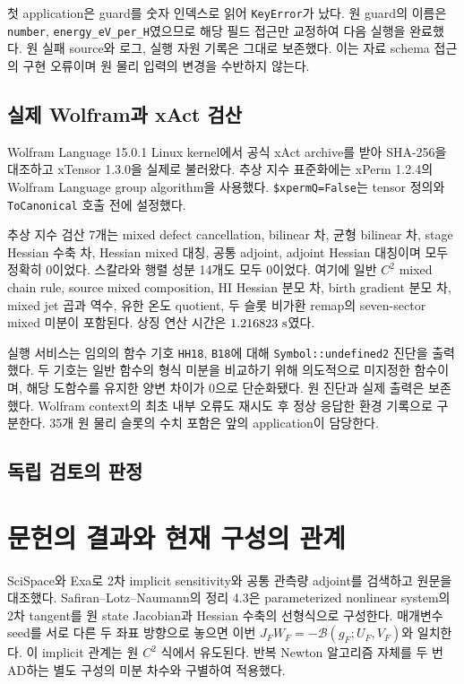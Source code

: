 첫 application은 guard를 숫자 인덱스로 읽어 \texttt{KeyError}가 났다.
원 guard의 이름은 \texttt{number}, \texttt{energy\_eV\_per\_H}였으므로
해당 필드 접근만 교정하여 다음 실행을 완료했다. 원 실패 source와
로그, 실행 자원 기록은 그대로 보존했다. 이는 자료 schema 접근의
구현 오류이며 원 물리 입력의 변경을 수반하지 않는다.

\subsection{실제 Wolfram과 xAct 검산}

Wolfram Language 15.0.1 Linux kernel에서 공식 xAct archive를
받아 SHA-256을 대조하고 xTensor 1.3.0을 실제로 불러왔다.
추상 지수 표준화에는 xPerm 1.2.4의 Wolfram Language group
algorithm을 사용했다. \texttt{\$xpermQ=False}는 tensor 정의와
\texttt{ToCanonical} 호출 전에 설정했다.

추상 지수 검산 7개는 mixed defect cancellation, bilinear 차,
균형 bilinear 차, stage Hessian 수축 차, Hessian mixed 대칭,
공통 adjoint, adjoint Hessian 대칭이며 모두 정확히 0이었다.
스칼라와 행렬 성분 14개도 모두 0이었다. 여기에 일반 $C^2$ mixed
chain rule, source mixed composition, HI Hessian 분모 차,
birth gradient 분모 차, mixed jet 곱과 역수, 유한 온도 quotient,
두 슬롯 비가환 remap의 seven-sector mixed 미분이 포함된다.
상징 연산 시간은 $1.216823\ {\rm s}$였다.

실행 서비스는 임의의 함수 기호 \texttt{HH18}, \texttt{B18}에 대해
\texttt{Symbol::undefined2} 진단을 출력했다. 두 기호는 일반 함수의
형식 미분을 비교하기 위해 의도적으로 미지정한 함수이며, 해당 도함수를
유지한 양변 차이가 0으로 단순화됐다. 원 진단과 실제 출력은 보존했다.
Wolfram context의 최초 내부 오류도 재시도 후 정상 응답한 환경 기록으로
구분한다. 35개 원 물리 슬롯의 수치 포함은 앞의 application이 담당한다.

\subsection{독립 검토의 판정}



\section{문헌의 결과와 현재 구성의 관계}

SciSpace와 Exa로 2차 implicit sensitivity와 공통 관측량 adjoint를
검색하고 원문을 대조했다. Safiran--Lotz--Naumann의 정리 4.3은
parameterized nonlinear system의 2차 tangent를 원 state Jacobian과
Hessian 수축의 선형식으로 구성한다. 매개변수 seed를 서로 다른 두
좌표 방향으로 놓으면 이번 $J_FW_F=-\mathcal B(g_F;U_F,V_F)$와
일치한다. 이 implicit 관계는 원 $C^2$ 식에서 유도된다. 반복 Newton
알고리즘 자체를 두 번 AD하는 별도 구성의 미분 차수와 구별하여
적용했다.\cite{SafiranLotzNaumann2015}

